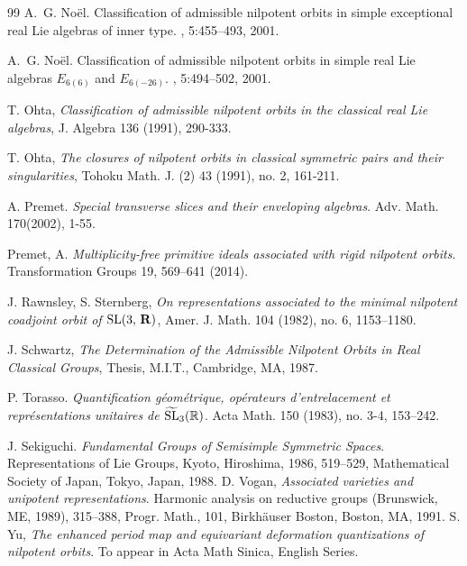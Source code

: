 \documentclass[12pt]{amsart}
\newcommand{\R}{\mathbb{R}}
\theoremstyle{definition}
\numberwithin{equation}{section}
\begin{document}
\begin{thebibliography}{99}
A.~G. No{\"e}l.
\newblock Classification of admissible nilpotent orbits in simple exceptional
real {L}ie algebras of inner type.
, 5:455--493, 2001.

A.~G. No{\"e}l.
\newblock Classification of admissible nilpotent orbits in simple real {L}ie
algebras {$E_{6(6)}$} and {$E_{6(-26)}$}.
, 5:494--502, 2001.

T. Ohta, {\it Classification of admissible nilpotent orbits in the classical real Lie algebras}, J. Algebra 136 (1991), 290-333.

T. Ohta, {\it The closures of nilpotent orbits in classical symmetric pairs and their singularities},
Tohoku Math. J. (2) 43 (1991), no. 2, 161-211.

 A. Premet. {\it Special transverse slices and their enveloping algebras}. Adv. Math. 170(2002), 1-55.

 Premet, A. {\it Multiplicity-free primitive ideals associated with rigid nilpotent orbits}. Transformation Groups 19, 569–641 (2014).

 J. Rawnsley, S. Sternberg, {\it On representations associated to the minimal nilpotent coadjoint orbit of {${\rm SL}(3,\,{\bf R})$}}, Amer. J. Math. 104 (1982), no. 6, 1153–1180.

 J. Schwartz, {\it The Determination of the Admissible Nilpotent Orbits in Real Classical Groups}, Thesis, M.I.T., Cambridge, MA, 1987.

  P. Torasso. {\it Quantification g\'{e}om\'{e}trique, op\'{e}rateurs d'entrelacement et
repr\'{e}sentations unitaires de {$\widetilde {\rm SL}_3({\R})$}}. Acta Math. 150 (1983), no. 3-4, 153–242.

 J. Sekiguchi. {\it Fundamental Groups of Semisimple Symmetric Spaces}. Representations of Lie Groups, Kyoto, Hiroshima, 1986, 519--529, Mathematical Society of Japan, Tokyo, Japan, 1988.
 D. Vogan, {\it Associated varieties and unipotent representations}.
Harmonic analysis on reductive groups (Brunswick, ME, 1989), 315–388, Progr. Math., 101, Birkh\"{a}user Boston, Boston, MA, 1991.
 S. Yu, {\it The enhanced period map and equivariant deformation quantizations of nilpotent orbits}. To appear in Acta Math Sinica, English Series.
\end{thebibliography}
\end{document}
